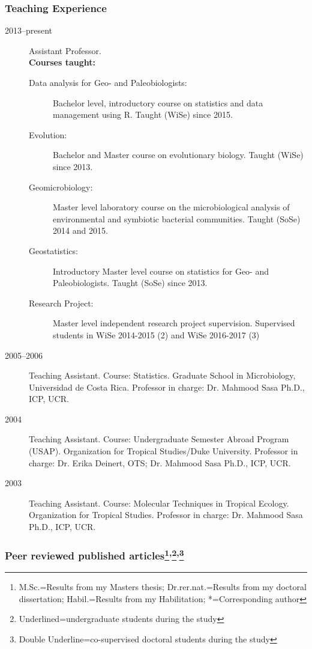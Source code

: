 \documentclass[letter,10pt]{article}
\begin{document}
\subsubsection*{Teaching Experience}
\begin{description}
\item[2013--present] Assistant Professor.\\\textbf{Courses taught:}
  \begin{description} 
	\item[Data analysis for Geo- and Paleobiologists:] Bachelor level, introductory course on statistics and data management using R. Taught (WiSe) since 2015.
	\item[Evolution:] Bachelor and Master course on evolutionary biology. Taught (WiSe) since 2013.
	\item[Geomicrobiology:] Master level laboratory course on the microbiological analysis of environmental and symbiotic bacterial communities. Taught (SoSe) 2014 and 2015.
	\item[Geostatistics:] Introductory Master level course on statistics for Geo- and Paleobiologists. Taught (SoSe) since 2013.
	\item[Research Project:] Master level independent research project supervision. Supervised students in WiSe 2014-2015 (2) and WiSe 2016-2017 (3)
  \end{description}

\item[2005--2006] Teaching Assistant. Course: Statistics. Graduate School in Microbiology, Universidad de Costa Rica. Professor in charge: Dr. Mahmood Sasa Ph.D., ICP, UCR.

\item[2004] Teaching Assistant. Course: Undergraduate Semester Abroad Program (USAP). Organization for Tropical Studies/Duke University. Professor in charge: Dr. Erika Deinert, OTS; Dr. Mahmood Sasa Ph.D., ICP, UCR.

\item[2003] Teaching Assistant. Course: Molecular Techniques in Tropical Ecology. Organization for Tropical Studies. Professor in charge: Dr. Mahmood Sasa Ph.D., ICP, UCR.
\end{description}

\subsubsection*{Peer reviewed published articles\footnote{M.Sc.=Results from my Masters thesis; Dr.rer.nat.=Results from my doctoral dissertation; Habil.=Results from my Habilitation; *=Corresponding author}\textsuperscript{,}\footnote{Underlined=undergraduate students during the study}\textsuperscript{,}\footnote{Double Underline=co-supervised doctoral students during the study}}%
\end{document}
